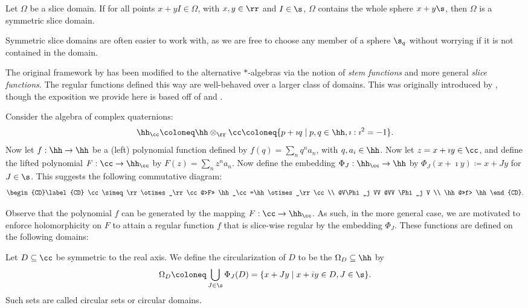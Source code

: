 \documentclass{amsart}
\begin{document}
\begin{defin}
    Let $\Omega$ be a slice domain. If for all points $x+yI\in\Omega$, with $x,y\in \rr$ and $I\in \s$, $\Omega$ contains the whole sphere $x+y\s$, then $\Omega$ is a symmetric slice domain. 
\end{defin}

Symmetric slice domains are often easier to work with, as we are free to choose any member of a sphere $\s_q$ without worrying if it is not contained in the domain. 

The original framework by \cite{GENTILI2007279} has been modified to the alternative $*$-algebras via the notion of \emph{stem functions} and more general \emph{slice functions}. The regular functions defined this way are well-behaved over a larger class of domains. This was originally introduced by \cite{Ghiloni_2011}, though the exposition we provide here is based off of \cite{Perotti_2019} and \cite{Altavilla_2019}. 

Consider the algebra of complex quaternions: \[\hh_\cc\coloneq \hh \otimes_\rr\cc\coloneq \{p+\imath q\mid p,q\in\hh, \imath: \imath^2=-1\}.\] Now let $f:\hh \to \hh$ be a (left) polynomial function defined by $f(q)=\sum_n q^na_n$, with $q, a_i\in\hh$. Now let $z=x+\imath y\in\cc$, and define the lifted polynomial $F:\cc\to\hh_\cc$ by $F(z)=\sum_n z^na_n$. Now define the embedding $\Phi_J:\hh_\cc\to\hh$ by $\Phi_J(x+\imath y)\coloneq x+Jy$ for $J\in\s$. This suggests the following commutative diagram:
\[
\begin{CD}\label{CD}
\cc \simeq \rr \otimes_\rr\cc @>F>> \hh_\cc=\hh\otimes_\rr \cc \\
@V\Phi_j VV   @VV \Phi_j V \\
\hh @>>f> \hh
\end{CD}.
\]

Observe that the polynomial $f$ can be generated by the mapping $F:\cc\to\hh_\cc$. As such, in the more general case, we are motivated to enforce holomorphicity on $F$ to attain a regular function $f$ that is slice-wise regular by the embedding $\Phi_J$. These functions are defined on the following domains:

\begin{defin}
    Let $D\subseteq \cc$ be symmetric to the real axis. We define the circularization of $D$ to be the $\Omega_D\subseteq\hh$ by \[\Omega_D\coloneq \bigcup_{J\in\s}\Phi_J(D)=\{x+Jy \mid x +iy\in D, J\in\s\}.\] Such sets are called circular sets or circular domains. 
\end{defin}
\end{document}
